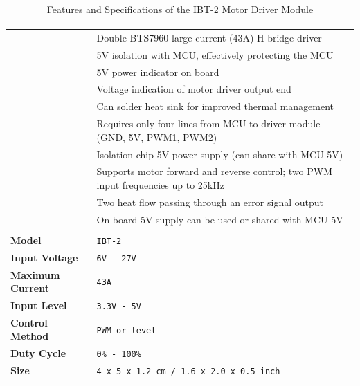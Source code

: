 \documentclass[../../main]{subfiles}
\begin{document}

\begin{table}[htbp]
    \centering
    \begin{tabular}{|>{\bfseries}l|>{\ttfamily}p{10cm}|} %
    \hline
    \multicolumn{2}{|c|}{\textbf{Features}} \\ \hline
     & Double BTS7960 large current (43A) H-bridge driver \\ 
     & 5V isolation with MCU, effectively protecting the MCU \\ 
     & 5V power indicator on board \\ 
     & Voltage indication of motor driver output end \\ 
     & Can solder heat sink for improved thermal management \\ 
     & Requires only four lines from MCU to driver module (GND, 5V, PWM1, PWM2) \\ 
     & Isolation chip 5V power supply (can share with MCU 5V) \\ 
     & Supports motor forward and reverse control; two PWM input frequencies up to 25kHz \\ 
     & Two heat flow passing through an error signal output \\ 
     & On-board 5V supply can be used or shared with MCU 5V \\ \hline

    \multicolumn{2}{|c|}{\textbf{Specifications}} \\ \hline
    Model & \texttt{IBT-2} \\ \hline
    Input Voltage & \texttt{6V - 27V} \\ \hline
    Maximum Current & \texttt{43A} \\ \hline
    Input Level & \texttt{3.3V - 5V} \\ \hline
    Control Method & \texttt{PWM or level} \\ \hline
    Duty Cycle & \texttt{0\% - 100\%} \\ \hline
    Size & \texttt{4 x 5 x 1.2 cm / 1.6 x 2.0 x 0.5 inch} \\ \hline
    \end{tabular}
    \caption{Features and Specifications of the IBT-2 Motor Driver Module}
    \label{Linear actuator specifications} %
    
\end{table}
    
\newpage
\end{document}
